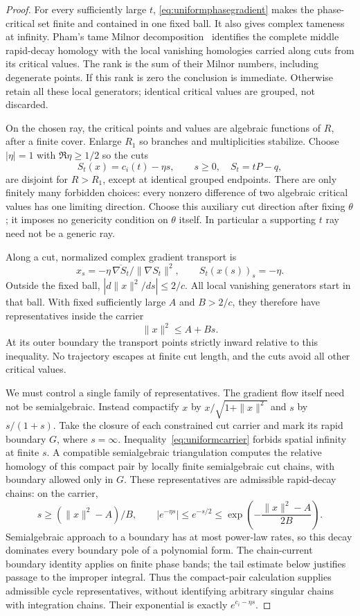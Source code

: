 \begin{proof}
For every sufficiently large $t$, \eqref{eq:uniformphasegradient}
makes the phase-critical set finite and contained in one fixed
ball. It also gives complex tameness at infinity. Pham's tame
Milnor decomposition~\cite[Part~I and Appendix]{Pham} identifies
the complete middle rapid-decay homology with the local vanishing
homologies carried along cuts from its critical values. The rank
is the sum of their Milnor numbers, including degenerate points.
If this rank is zero the conclusion is immediate. Otherwise
retain all these local generators; identical critical values
are grouped, not discarded.

On the chosen ray, the critical points and values are algebraic
functions of $R$, after a finite cover. Enlarge $R_1$ so branches
and multiplicities stabilize. Choose $|\eta|=1$ with
$\Re\eta\ge1/2$ so the cuts
\[
 S_t(x)=c_i(t)-\eta s,\qquad s\ge0,\quad S_t=tP-q,
\]
are disjoint for $R>R_1$, except at identical grouped endpoints.
There are only finitely many forbidden choices: every nonzero
difference of two algebraic critical values has one limiting
direction. Choose this auxiliary cut direction after fixing
$\theta$; it imposes no genericity condition on $\theta$ itself.
In particular a supporting $t$ ray need not be a generic ray.

Along a cut, normalized complex gradient transport is
\[
 x_s=-\eta\,\overline{\nabla S_t}/\|\nabla S_t\|^2,
               \qquad S_t(x(s))_s=-\eta.
\]
Outside the fixed ball,
$|d\|x\|^2/ds|\le2/c$. All local vanishing generators start
in that ball. With fixed sufficiently large $A$ and $B>2/c$,
they therefore have representatives inside the carrier
\begin{equation}\label{eq:uniformcarrier}
 \|x\|^2\le A+Bs.
\end{equation}
At its outer boundary the transport points strictly inward
relative to this inequality. No trajectory escapes at finite
cut length, and the cuts avoid all other critical values.

We must control a single family of representatives. The gradient
flow itself need not be semialgebraic. Instead compactify $x$
by $x/\sqrt{1+\|x\|^2}$ and $s$ by $s/(1+s)$. Take the closure
of each constrained cut carrier and mark its rapid boundary
$G$, where $s=\infty$. Inequality~\eqref{eq:uniformcarrier}
forbids spatial infinity at finite $s$. A compatible
semialgebraic triangulation computes the relative homology of
this compact pair by locally finite semialgebraic cut chains,
with boundary allowed only in $G$. These representatives are
admissible rapid-decay chains: on the carrier,
\[
 s\geq(\|x\|^2-A)/B,\qquad
 |e^{-\eta s}|\leq e^{-s/2}
       \leq \exp\!\left(-\frac{\|x\|^2-A}{2B}\right).
\]
Semialgebraic approach to a boundary has at most power-law rates,
so this decay dominates every boundary pole of a polynomial form.
The chain-current boundary identity applies on finite phase bands;
the tail estimate below justifies passage to the improper integral.
Thus the compact-pair calculation supplies admissible cycle
representatives, without identifying arbitrary singular chains
with integration chains. Their exponential is exactly
$e^{c_i-\eta s}$.


\end{proof}
